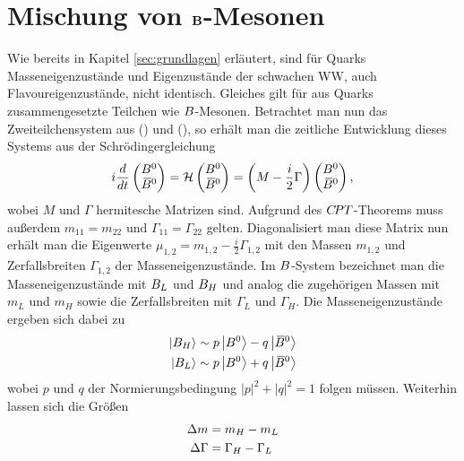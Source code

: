 \section[head={Mischung von \B-Mesonen},tocentry={Mischung von \B-Mesonen}]{Mischung von $\mathbf{{B}}$-Mesonen}\label{sec:mixing}

Wie bereits in Kapitel \ref{sec:grundlagen} erläutert, sind für Quarks Masseneigenzustände und Eigenzustände der schwachen WW, auch Flavoureigenzustände, nicht identisch. Gleiches gilt für aus Quarks zusammengesetzte Teilchen wie ${B}$-Mesonen. Betrachtet man nun das Zweiteilchensystem aus \Bz (\bquarkbar\dquark) und \Bzb (\bquark\dquarkbar), so erhält man die zeitliche Entwicklung dieses Systems aus der Schrödingergleichung
\begin{equation}
i\frac{d}{dt}\begin{pmatrix}{\ensuremath{{B}^0}}\\ {{\kern 0.18em\overline{\kern -0.18em B}{}}{}^0}\end{pmatrix}=\mathcal{H}\begin{pmatrix}{\ensuremath{{B}^0}}\\ {{\kern 0.18em\overline{\kern -0.18em B}{}}{}^0}\end{pmatrix}=\left(M-\frac{i}{2}\Gamma\right)\begin{pmatrix}{\ensuremath{{B}^0}}\\ {{\kern 0.18em\overline{\kern -0.18em B}{}}{}^0}\end{pmatrix},
\end{equation}
wobei $M$ und $\Gamma$ hermitesche Matrizen sind. Aufgrund des ${C\!PT}$-Theorems muss außerdem  $m_{11}=m_{22}$ und $\Gamma_{11}=\Gamma_{22}$ gelten. Diagonalisiert man diese Matrix nun erhält man die Eigenwerte $\mu_{1,2}=m_{1,2}-\frac{i}{2}\Gamma_{1,2}$ mit den Massen $m_{1,2}$ und Zerfallsbreiten $\Gamma_{1,2}$ der Masseneigenzustände. Im ${B}$-System bezeichnet man  die Masseneigenzustände mit ${B}_L$ und ${B}_H$ und analog die zugehörigen Massen mit  $m_L$ und $m_H$ sowie die Zerfallsbreiten mit $\Gamma_L$ und $\Gamma_H$. Die Masseneigenzustände ergeben sich dabei zu
\begin{equation}
\begin{split}
\left|B_H\right>&\sim p\left|{{B}^0}\right>-q\left|{{\kern 0.18em\overline{\kern -0.18em B}{}}{}^0}\right>\\
\left|B_L\right>&\sim p\left|{{B}^0}\right>+q\left|{{\kern 0.18em\overline{\kern -0.18em B}{}}{}^0}\right>
\end{split}
\end{equation}
wobei $p$ und $q$ der Normierungsbedingung $\left|p\right|^2+\left|q\right|^2=1$ folgen müssen. Weiterhin lassen sich die Größen 
\begin{align}
{\ensuremath{\Delta m}}&=m_H-m_L\\
\Delta\Gamma&=\Gamma_H-\Gamma_L
\end{align}
